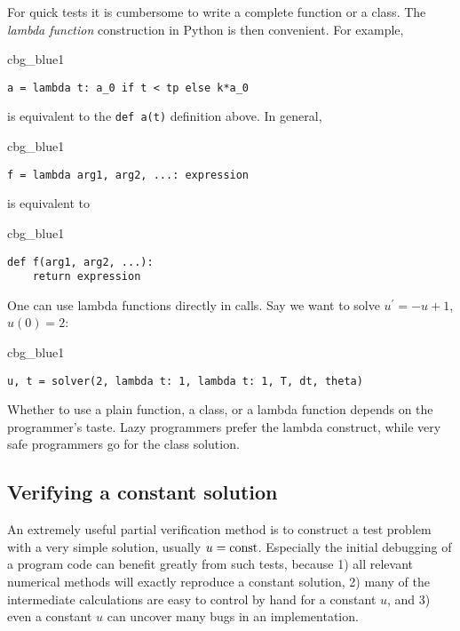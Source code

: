 \documentclass[graybox,sectrefs,envcountresetchap,open=right,final]{svmonodo}
\newenvironment{_cod_tight}[1]{
   \def\FrameCommand{\colorbox{#1}}
   \FrameRule0.6pt\MakeFramed {\FrameRestore}\vskip3mm}
   {\vskip0mm\endMakeFramed}
\newenvironment{cod}[1]{
\bgroup\rmfamily
\fboxsep=0mm\relax
\begin{_cod_tight}{#1}
\list{}{\parsep=-2mm\parskip=0mm\topsep=0pt\leftmargin=2mm
\rightmargin=2\leftmargin\leftmargin=4pt\relax}
\item\relax}
{\endlist\end{_cod_tight}\egroup}
\begin{document}
For quick tests it is cumbersome to write a complete function or a class.
The \emph{lambda function} construction in Python is then convenient. For example,
\begin{cod}{cbg_blue1}\begin{Verbatim}[numbers=none,fontsize=\fontsize{9pt}{9pt},baselinestretch=0.95,xleftmargin=2mm]
a = lambda t: a_0 if t < tp else k*a_0
\end{Verbatim}
\end{cod}
\noindent
is equivalent to the \texttt{def a(t)} definition above. In general,
\begin{cod}{cbg_blue1}\begin{Verbatim}[numbers=none,fontsize=\fontsize{9pt}{9pt},baselinestretch=0.95,xleftmargin=2mm]
f = lambda arg1, arg2, ...: expression
\end{Verbatim}
\end{cod}
\noindent
is equivalent to
\begin{cod}{cbg_blue1}\begin{Verbatim}[numbers=none,fontsize=\fontsize{9pt}{9pt},baselinestretch=0.95,xleftmargin=2mm]
def f(arg1, arg2, ...):
    return expression
\end{Verbatim}
\end{cod}
\noindent
One can use lambda functions directly in calls. Say we want to
solve $u^{\prime}=-u+1$, $u(0)=2$:
\begin{cod}{cbg_blue1}\begin{Verbatim}[numbers=none,fontsize=\fontsize{9pt}{9pt},baselinestretch=0.95,xleftmargin=2mm]
u, t = solver(2, lambda t: 1, lambda t: 1, T, dt, theta)
\end{Verbatim}
\end{cod}
\noindent

Whether to use a plain function, a class, or a lambda function depends
on the programmer's taste. Lazy programmers prefer the lambda construct, while
very safe programmers go for the class solution.

\subsection{Verifying a constant solution}
\label{decay:verify:trivial}

An extremely useful partial verification method is to construct a test
problem with a very simple solution, usually $u=\hbox{const}$.
Especially the initial debugging of a program code can benefit greatly
from such tests, because 1) all relevant numerical methods will
exactly reproduce a constant solution, 2) many of the intermediate
calculations are easy to control by hand for a constant $u$, and 3) even a
constant $u$ can uncover many bugs in an implementation.
\end{document}

